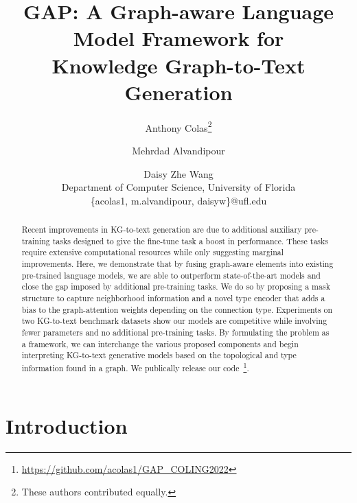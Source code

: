 \documentclass[11pt]{article}
\makeatletter
\newcommand{\printfnsymbol}[1]{\textsuperscript{\@fnsymbol{#1}}}
\makeatother
\begin{document}
\title{GAP: A Graph-aware Language Model Framework for\\ Knowledge Graph-to-Text Generation}



\author{Anthony Colas\thanks{These authors contributed equally.} \and Mehrdad Alvandipour\printfnsymbol{1}\and Daisy Zhe Wang\\
        Department of Computer Science, University of Florida \\
        \{acolas1, m.alvandipour, daisyw\}@ufl.edu}
        




\maketitle
\begin{abstract}
Recent improvements in KG-to-text generation are due to additional auxiliary pre-training tasks designed to give the fine-tune task a boost in performance. These tasks require extensive computational resources while only suggesting marginal improvements. Here, we demonstrate that by fusing graph-aware elements into existing pre-trained language models, we are able to outperform state-of-the-art models and close the gap imposed by additional pre-training tasks. We do so by proposing a mask structure to capture neighborhood information and a novel type encoder that adds a bias to the graph-attention weights depending on the connection type. Experiments on two KG-to-text benchmark datasets show our models are competitive while involving fewer parameters and no additional pre-training tasks. By formulating the problem as a framework, we can interchange the various proposed components and begin interpreting KG-to-text generative models based on the topological and type information found in a graph. We publically release our code~\footnote{ \url{https://github.com/acolas1/GAP\_COLING2022}}.
\end{abstract}

\section{Introduction}
\end{document}
